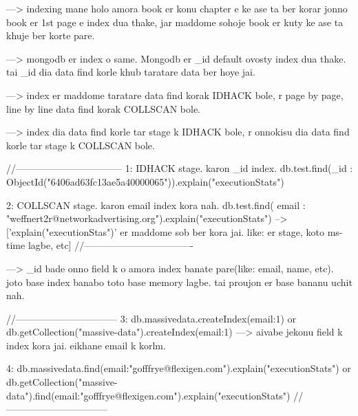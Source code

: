 ---> indexing mane holo amora book er konu chapter e ke ase ta ber korar jonno book er 1st page e index dua thake, jar maddome sohoje book er kuty ke ase ta khuje ber korte pare.

---> mongodb er index o same. Mongodb er _id default ovosty index dua thake. tai _id dia data find korle khub taratare data ber hoye jai.

---> index er maddome taratare data find korak IDHACK bole, r page by page, line by line data find korak COLLSCAN bole.

---> index dia data find korle tar stage k IDHACK bole, r onnokisu dia data find korle tar stage k COLLSCAN  bole.

//---------------------------------
1: IDHACK stage. karon _id index.
db.test.find({_id : ObjectId("6406ad63fc13ae5a40000065")}).explain("executionStats")

2: COLLSCAN stage. karon email index kora nah.
db.test.find({	email : "weffnert2r@networkadvertising.org"}).explain("executionStats")
-->['explain("executionStas")' er maddome sob ber kora jai. like: er stage, koto ms-time lagbe, etc]
//----------------------------------

---> _id bade onno field k o amora index banate pare(like: email, name, etc). joto base index banabo toto base memory lagbe. tai proujon er base bananu uchit nah.

//--------------------------------
3:
db.massivedata.createIndex({email:1})
or
db.getCollection("massive-data").createIndex({email:1})
---> aivabe jekonu field k index kora jai. eikhane email k korlm.

4: 
db.massivedata.find({email:"gofffrye@flexigen.com"}).explain("executionStats")
or 
db.getCollection("massive-data").find({email:"gofffrye@flexigen.com"}).explain("executionStats")
//--------------------------------


